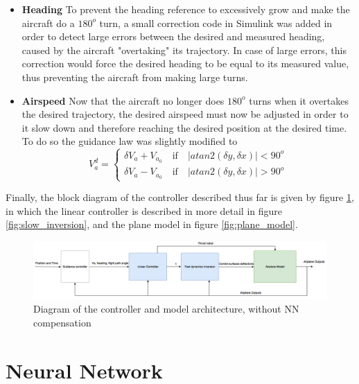 \begin{itemize}
\item \textbf{Heading} To prevent the heading reference to excessively grow and make the aircraft do a $180^o$ turn, a small correction code in Simulink was added in order to detect large errors between the desired and measured heading, caused by the aircraft "overtaking" its trajectory. In case of large errors, this correction would force the desired heading to be equal to its measured value, thus preventing the aircraft from making large turns. 

\item \textbf{Airspeed} Now that the aircraft no longer does $180^o$ turns when it overtakes the desired trajectory, the desired airspeed must now be adjusted in order to it slow down and therefore reaching the desired position at the desired time. To do so the guidance law was slightly modified to 
\begin{equation}
V_a^d=\begin{cases}
\delta V_a  + V_{a_0} \quad \text{if} \quad |atan2(\delta y,\delta x)|<90^o\\
\delta V_a  - V_{a_0} \quad \text{if} \quad |atan2(\delta y,\delta x)|>90^o
\end{cases}
\label{eq:speed_guidance}
\end{equation}
\end{itemize}

Finally, the block diagram of the controller described thus far is given by figure \ref{fig:controller_noNN}, in which the linear controller is described in more detail in figure \ref{fig:slow_inversion}, and the plane model in figure \ref{fig:plane_model}.

\begin{figure}[!htb]
  \centering
  \includegraphics[width=1.15\textwidth]{Figures/controller_noNN.png}
  \caption[Diagram of the controller and model architecture, without NN compensation]{Diagram of the controller and model architecture, without NN compensation}
  \label{fig:controller_noNN}
\end{figure}

\section{Neural Network}
\label{section:NN}

